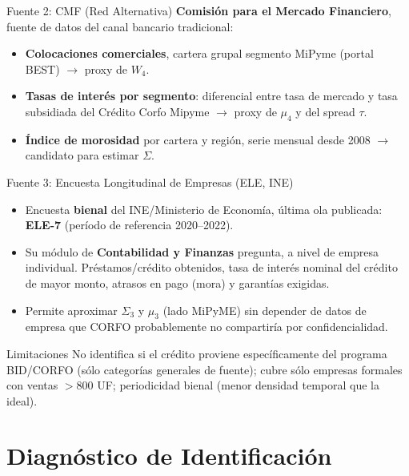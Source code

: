 \documentclass[aspectratio=169]{beamer}
\begin{document}
\begin{frame}{Fuente 2: CMF (Red Alternativa)}
\textbf{Comisión para el Mercado Financiero}, fuente de datos del canal bancario tradicional:
\begin{itemize}
    \item \textbf{Colocaciones comerciales}, cartera grupal segmento MiPyme (portal BEST) $\to$ proxy de $W_4$.
    \item \textbf{Tasas de interés por segmento}: diferencial entre tasa de mercado y tasa subsidiada del Crédito Corfo Mipyme $\to$ proxy de $\mu_4$ y del spread $\tau$.
    \item \textbf{Índice de morosidad} por cartera y región, serie mensual desde 2008 $\to$ candidato para estimar $\Sigma$.
\end{itemize}
\end{frame}

\begin{frame}{Fuente 3: Encuesta Longitudinal de Empresas (ELE, INE)}
\begin{itemize}
    \item Encuesta \textbf{bienal} del INE/Ministerio de Economía, última ola publicada: \textbf{ELE-7} (período de referencia 2020--2022).
    \item Su módulo de \textbf{Contabilidad y Finanzas} pregunta, a nivel de empresa individual. Préstamos/crédito obtenidos, tasa de interés nominal del crédito de mayor monto, atrasos en pago (mora) y garantías exigidas.
    \item Permite aproximar $\Sigma_3$ y $\mu_3$ (lado MiPyME) sin depender de datos de empresa que CORFO probablemente no compartiría por confidencialidad.
\end{itemize}

\vspace{0.3cm}
\begin{alertblock}{Limitaciones}
No identifica si el crédito proviene específicamente del programa BID/CORFO (sólo categorías generales de fuente); cubre sólo empresas formales con ventas $>$800 UF; periodicidad bienal (menor densidad temporal que la ideal).
\end{alertblock}
\end{frame}

\section{Diagnóstico de Identificación}
\end{document}
